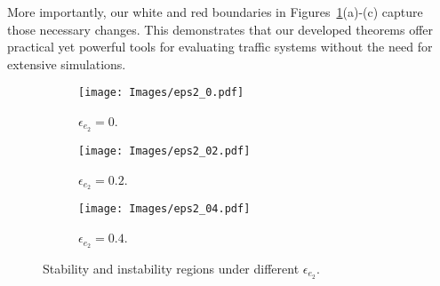 More importantly, our white and red boundaries in Figures~\ref{fig_variance}(a)-(c) capture those necessary changes. This demonstrates that our developed theorems offer practical yet powerful tools for evaluating traffic systems without the need for extensive simulations.

\begin{figure}[htbp]
    \centering
    \begin{subfigure}{0.25\linewidth}
        \centering
        \texttt{[image: Images/eps2\_0.pdf]}
    \caption{$\epsilon_{e_2}=0$.}
    \end{subfigure}
    \begin{subfigure}{0.25\linewidth}
        \centering
        \texttt{[image: Images/eps2\_02.pdf]}
    \caption{$\epsilon_{e_2}=0.2$.}
    \end{subfigure}
    \begin{subfigure}{0.25\linewidth}
        \centering
        \texttt{[image: Images/eps2\_04.pdf]}
    \caption{$\epsilon_{e_2}=0.4$.}
    \end{subfigure}
    \caption{Stability and instability regions under different $\epsilon_{e_2}$.}
    \label{fig_variance}
\end{figure}